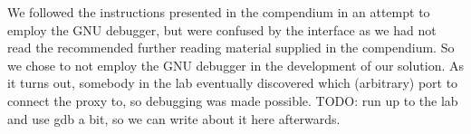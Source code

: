 We followed the instructions presented in the compendium in an attempt to employ the GNU debugger, but were confused by the interface as we had not read the recommended further reading material supplied in the compendium.
So we chose to not employ the GNU debugger in the development of our solution.
As it turns out, somebody in the lab eventually discovered which (arbitrary) port to connect the proxy to, so debugging was made possible.
TODO: run up to the lab and use gdb a bit, so we can write about it here afterwards.
